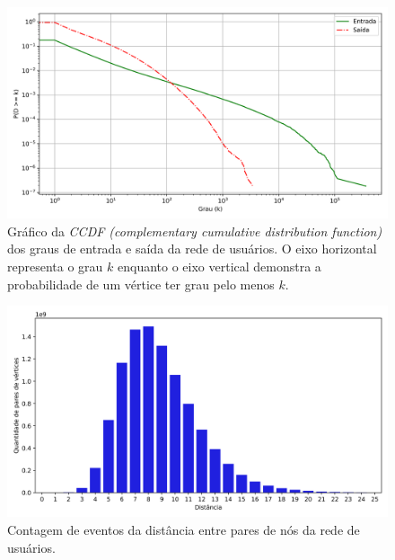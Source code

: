 \begin{figure}[h]
\begin{center} {
    \begin{center}
    \includegraphics[scale=0.65]{images/graph_ccdf.png}
    \caption{Gráfico da \textit{CCDF (complementary cumulative distribution function)}
             dos graus de entrada e saída da rede de usuários.
             O eixo horizontal representa o grau $k$ enquanto o eixo vertical
             demonstra a probabilidade de um vértice ter grau pelo menos $k$.}
    \label{fig:graph_ccdf}
    \end{center}
}
\end{center}
\end{figure}

\begin{figure}[h]
\begin{center} {
    \begin{center}
    \includegraphics[scale=0.65]{images/graph_distance.png}
    \caption{Contagem de eventos da distância entre pares de nós da rede de usuários.}
    \label{fig:graph_distance}
    \end{center}
}
\end{center}
\end{figure}

